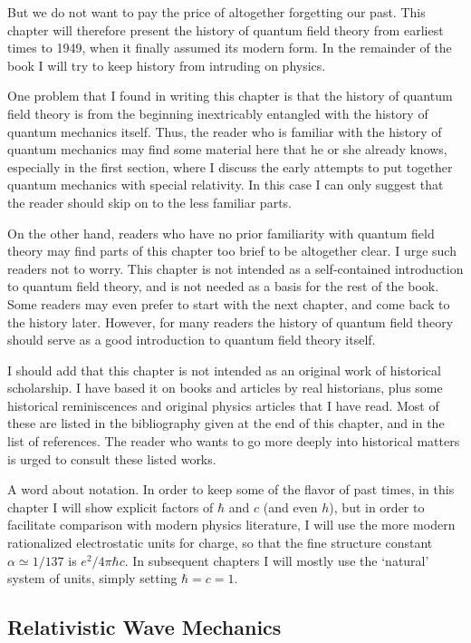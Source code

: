 But we do not want to pay the price of altogether forgetting our past.
This chapter will therefore present the history of quantum field theory
from earliest times to 1949, when it finally assumed its modern form. In
the remainder of the book I will try to keep history from intruding on
physics.

One problem that I found in writing this chapter is that the history of
quantum field theory is from the beginning inextricably entangled with
the history of quantum mechanics itself. Thus, the reader who is familiar
with the history of quantum mechanics may find some material here that
he or she already knows, especially in the first section, where I discuss the
early attempts to put together quantum mechanics with special relativity.
In this case I can only suggest that the reader should skip on to the less
familiar parts.

On the other hand, readers who have no prior familiarity with quantum
field theory may find parts of this chapter too brief to be altogether clear.
I urge such readers not to worry. This chapter is not intended as a
self-contained introduction to quantum field theory, and is not needed as
a basis for the rest of the book. Some readers may even prefer to start
with the next chapter, and come back to the history later. However, for
many readers the history of quantum field theory should serve as a good
introduction to quantum field theory itself.

I should add that this chapter is not intended as an original work
of historical scholarship. I have based it on books and articles by real
historians, plus some historical reminiscences and original physics articles
that I have read. Most of these are listed in the bibliography given at the
end of this chapter, and in the list of references. The reader who wants
to go more deeply into historical matters is urged to consult these listed
works.

A word about notation. In order to keep some of the flavor of past
times, in this chapter I will show explicit factors of $\hbar$ and $c$ (and even
$h$), but in order to facilitate comparison with modern physics literature,
I will use the more modern rationalized electrostatic units for charge, so
that the fine structure constant $\alpha\simeq 1/137$ is $e^2/4\pi\hbar c$. In subsequent
chapters I will mostly use the `natural' system of units, simply setting
$\hbar=c=1$.

\subsection{Relativistic Wave Mechanics}


